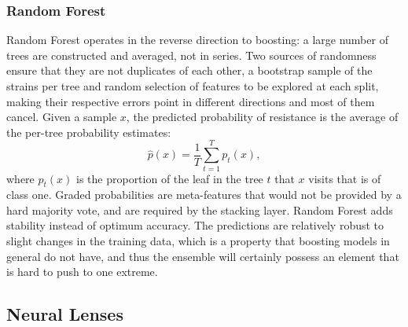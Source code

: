 \documentclass[journal]{IEEEtran}
\begin{document}
\subsubsection{Random Forest}
Random Forest \cite{breiman2001rf} operates in the reverse direction to boosting: a
large number of trees are constructed and averaged, not in series. Two sources of
randomness ensure that they are not duplicates of each other, a bootstrap sample of
the strains \cite{breiman1996bagging} per tree and random selection of features to
be explored at each split, making their respective errors point in different
directions and most of them cancel. Given a sample $x$, the predicted probability of
resistance is the average of the per-tree probability estimates:
\begin{equation}
\hat{p}(x) = \frac{1}{T} \sum_{t=1}^{T} p_t(x),
\label{eq:rf_score}
\end{equation}
where $p_t(x)$ is the proportion of the leaf in the tree $t$ that $x$ visits that is
of class one. Graded probabilities are meta-features that would not be provided by a
hard majority vote, and are required by the stacking layer. Random Forest adds
stability instead of optimum accuracy. The predictions are relatively robust to
slight changes in the training data, which is a property that boosting models in
general do not have, and thus the ensemble will certainly possess an element that is
hard to push to one extreme.

\subsection{Neural Lenses}
\end{document}
